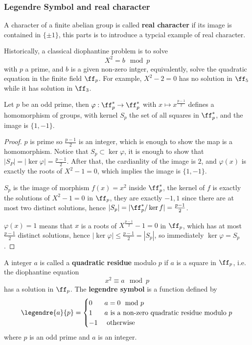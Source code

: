 \subsubsection{Legendre Symbol and real character}
A character of a finite abelian group is called \textbf{real character} if its image is contained in \(\{\pm 1\}\), this parts is to introduce a typcial example of real character.

Historically, a classical diophantine problem is to solve
\[X^2 = b \mod p\]
with \(p\) a prime, and \(b\) is a given non-zero intger, equivalently, solve the quadratic equation in the finite field \(\ff_p\). For example,
\(X^2 - 2 = 0\) has no solution in \(\ff_5\) while it has solution in \(\ff_3\).

\begin{lemma}
    Let \(p\) be an odd prime, then \(\varphi: \ff_p^* \to \ff_p^*\) with \(x \mapsto x^{\frac{p-1}{2}}\) defines a homomorphism of groups, with kernel \(S_p\) the set of all squares in \(\ff_p^*\), and the image is \(\{1,-1\}\).
\end{lemma}
\begin{proof}
    \(p\) is prime so \(\frac{p-1}{2}\) is an integer, which is enough to show the map is a homomorphism. Notice that \(S_p \subset \ker \varphi\), it is enough to show that \(|S_P| = |\ker \varphi| = \frac{p-1}{2}\). After that, the cardianlity of the image is \(2\), and \(\varphi(x)\) is exactly the roots of \(X^2-1 = 0\), which implies the image is \(\{1,-1\}\).

    \(S_p\) is the image of morphism \(f(x) = x^2\) inside \(\ff_p^*\), the kernel of \(f\) is exactly the solutions of \(X^2-1=0\) in \(\ff_p\), they are exactly \({-1,1}\) since there are at most two distinct solutions, hence \(|S_p| = |\ff_p^*/\ker f| = \frac{p-1}{2}\).

    \(\varphi(x) = 1\) means that \(x\) is a roots of \(X^{\frac{p-1}{2}} - 1 = 0\) in \(\ff_p\), which has at most \(\frac{p-1}{2}\) distinct solutions, hence \(|\ker \varphi| \leq \frac{p-1}{2} = |S_p|\), so immediately \(\ker \varphi = S_p\).
\end{proof}

\begin{colordefinition}
    A integer \(a\) is called a \textbf{quadratic residue} modulo \(p\) if \(a\) is a square in \(\ff_p\), i.e. the diophantine equation
    \[x^2 \equiv a \mod p\]
    has a solution in \(\ff_p\). The \textbf{legendre symbol} is a function defined by
    \[\legendre{a}{p} = \begin{cases}
        0 & a = 0 \mod p \\
        1 & a \text{ is a non-zero quadratic residue modulo } p \\
        -1 &  \text{ otherwise }
    \end{cases}\]
    where \(p\) is an odd prime and \(a\) is an integer.
\end{colordefinition}

